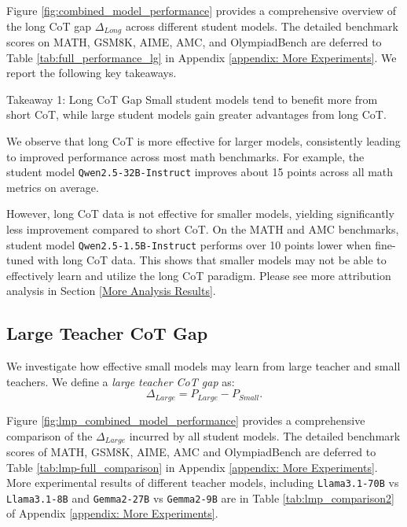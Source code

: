 Figure \ref{fig:combined_model_performance} provides a comprehensive overview of the long CoT gap $\Delta_{Long}$ across different student models. 
The detailed benchmark scores on MATH, GSM8K, AIME, AMC, and OlympiadBench are deferred to Table \ref{tab:full_performance_lg} in Appendix \ref{appendix: More Experiments}.
We report the following key takeaways. 

\begin{AIbox}{Takeaway 1: Long CoT Gap}
Small student models tend to benefit more from short CoT, while large student models gain greater advantages from long CoT.

\end{AIbox}

We observe that long CoT is more effective for larger models, consistently leading to improved performance across most math benchmarks. 
For example, the student model \texttt{Qwen2.5-32B-Instruct} improves about 15 points across all math metrics on average. 

However, long CoT data is not effective for smaller models, yielding significantly less improvement compared to short CoT. On the MATH and AMC benchmarks, student model \texttt{Qwen2.5-1.5B-Instruct}  performs over 10 points lower when fine-tuned with long CoT data. This shows that smaller models may not be able to effectively learn and utilize the long CoT paradigm. 
Please see more attribution analysis in Section \ref{More Analysis Results}.










\subsection{Large Teacher CoT Gap}
We investigate how effective small models may learn from large teacher and small teachers.
We define a \emph{large teacher CoT gap} as:
\[
\Delta_{Large} = P_{Large} - P_{Small}.
\]

Figure \ref{fig:lmp_combined_model_performance} provides a comprehensive comparison of the $\Delta_{Large}$ incurred by all student models. 
The detailed benchmark scores of MATH, GSM8K, AIME, AMC and OlympiadBench are deferred to Table \ref{tab:lmp-full_comparison} in Appendix \ref{appendix: More Experiments}. More experimental results of different teacher models, including \texttt{Llama3.1-70B} vs \texttt{Llama3.1-8B} and \texttt{Gemma2-27B} vs \texttt{Gemma2-9B} are in Table \ref{tab:lmp_comparison2} of Appendix \ref{appendix: More Experiments}.

